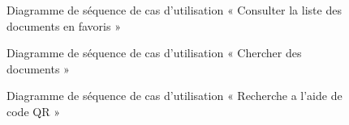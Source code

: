 \begin{figure}[H]
  \centering
  \caption{Diagramme de séquence de cas d'utilisation « Consulter la liste des documents en favoris  »}
  \label{fig:sequence_favorit_document}
\end{figure}
\begin{figure}[H]
  \centering
  \caption{Diagramme de séquence de cas d'utilisation « Chercher des documents  »}
  \label{fig:sequence_charcher_document}
\end{figure}
\begin{figure}[H]
  \centering
  \caption{Diagramme de séquence de cas d'utilisation « Recherche a l'aide de code QR »}
  \label{fig:sequence_scan_qr}
\end{figure}

